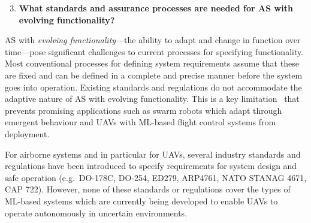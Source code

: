\documentclass[sigconf,nonacm]{acmart}%
\begin{document}
	\begin{enumerate}[leftmargin=0.5cm]
		\setcounter{enumi}{2}
		\item \textbf{What standards and assurance processes are needed for AS with evolving functionality?}
	\end{enumerate}
	AS with \emph{evolving functionality}---the ability to adapt and change in function over time---pose significant challenges to current processes for specifying functionality. 
	Most conventional processes for defining system requirements assume that these are fixed and can be defined in a complete and precise manner before the system goes into operation. 
	Existing standards and regulations do not accommodate the adaptive nature of AS with evolving functionality. This is a key limitation~\cite{Fisher2020} that prevents promising applications such as swarm robots which adapt through emergent behaviour and UAVs with ML-based flight control systems from deployment.
	
	
	For airborne systems and in particular for UAVs, several industry standards and regulations have been introduced to specify requirements for system design and safe operation (e.g.\ DO-178C, DO-254, ED279, ARP4761, NATO STANAG 4671, CAP 722). However, none of these standards or regulations cover the types of ML-based systems which are currently being developed to enable UAVs to operate autonomously in uncertain environments.
	
\end{document}
